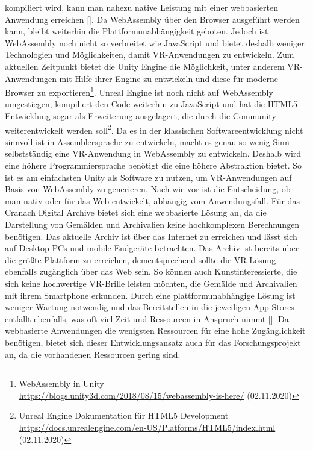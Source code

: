 \documentclass[a4paper,12pt,oneside]{article}
\begin{document}
        kompiliert wird, kann man nahezu native Leistung mit einer webbasierten Anwendung erreichen
        [\cite[186]{Haas2017Jun}]. Da WebAssembly über den Browser ausgeführt werden kann,
        bleibt weiterhin die Plattformunabhängigkeit geboten. Jedoch ist WebAssembly noch nicht
        so verbreitet wie JavaScript und bietet deshalb weniger Technologien und Möglichkeiten,
        damit VR-Anwendungen zu entwickeln. Zum aktuellen Zeitpunkt bietet die Unity Engine
        die Möglichkeit, unter anderem VR-Anwendungen mit Hilfe ihrer Engine zu entwickeln und
        diese für moderne Browser zu exportieren\footnote{WebAssembly in Unity | \url{https://blogs.unity3d.com/2018/08/15/webassembly-is-here/} (02.11.2020)}.
        Unreal Engine ist noch nicht auf WebAssembly umgestiegen, kompiliert den Code weiterhin
        zu JavaScript und hat die HTML5-Entwicklung sogar als Erweiterung ausgelagert, die durch
        die Community weiterentwickelt werden soll\footnote{Unreal Engine Dokumentation für HTML5 Development | \url{https://docs.unrealengine.com/en-US/Platforms/HTML5/index.html} (02.11.2020)}.
        Da es in der klassischen Softwareentwicklung nicht sinnvoll ist in Assemblersprache
        zu entwickeln, macht es genau so wenig Sinn selbstständig eine VR-Anwendung in 
        WebAssembly zu entwickeln. Deshalb wird eine höhere Programmiersprache benötigt die
        eine höhere Abstraktion bietet. So ist es am einfachsten Unity als Software zu nutzen,
        um VR-Anwendungen auf Basis von WebAssembly zu generieren.
        Nach wie vor ist die Entscheidung, ob man nativ oder für das Web entwickelt, abhängig
        vom Anwendungsfall. Für das Cranach Digital Archive bietet sich eine webbasierte Lösung
        an, da die Darstellung von Gemälden und Archivalien keine hochkomplexen Berechnungen
        benötigen. Das aktuelle Archiv ist über das Internet zu erreichen und lässt sich auf
        Desktop-PCs und mobile Endgeräte betrachten. Das Archiv ist bereits über die größte
        Plattform zu erreichen, dementsprechend sollte die VR-Lösung ebenfalls zugänglich
        über das Web sein. So können auch Kunstinteressierte, die sich keine hochwertige
        VR-Brille leisten möchten, die Gemälde und Archivalien mit ihrem Smartphone erkunden.
        Durch eine plattformunabhängige Lösung ist weniger Wartung notwendig und das
        Bereitstellen in die jeweiligen App Stores entfällt ebenfalls, was oft viel Zeit und
        Ressourcen in Anspruch nimmt [\cite[248]{Ater2017}]. Da webbasierte Anwendungen die
        wenigsten Ressourcen für eine hohe Zugänglichkeit benötigen, bietet sich dieser
        Entwicklungsansatz auch für das Forschungsprojekt an, da die vorhandenen Ressourcen
        gering sind.
\end{document}
